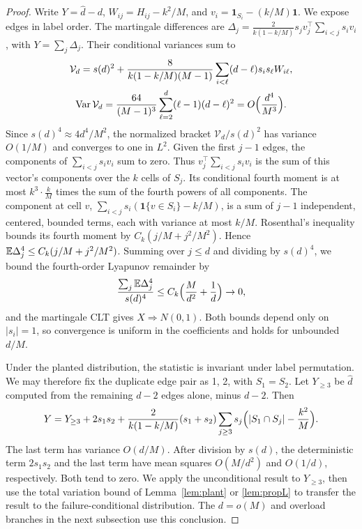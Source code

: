 \begin{proof}
Write $Y=\widehat d-d$, $W_{ij}=H_{ij}-k^2/M$, and $v_i=\mathbf1_{S_i}-(k/M)\mathbf1$. We expose edges in label order. The martingale differences are $\Delta_j=\frac{2}{k(1-k/M)}s_jv_j^\top\sum_{i<j}s_iv_i$, with $Y=\sum_j\Delta_j$. Their conditional variances sum to
\begin{gather*}
\mathcal V_d=s(d)^2+\frac{8}{k(1-k/M)(M-1)}\sum_{i<\ell}(d-\ell)s_is_\ell W_{i\ell},\\
\operatorname{Var}\mathcal V_d=\frac{64}{(M-1)^3}\sum_{\ell=2}^d(\ell-1)(d-\ell)^2=O\Bigl(\frac{d^4}{M^3}\Bigr).
\end{gather*}
Since $s(d)^4\approx4d^4/M^2$, the normalized bracket $\mathcal V_d/s(d)^2$ has variance $O(1/M)$ and converges to one in $L^2$. Given the first $j-1$ edges, the components of $\sum_{i<j}s_iv_i$ sum to zero. Thus $v_j^\top\sum_{i<j}s_iv_i$ is the sum of this vector's components over the $k$ cells of $S_j$. Its conditional fourth moment is at most $k^3\cdot\frac kM$ times the sum of the fourth powers of all components. The component at cell $v$, $\sum_{i<j}s_i(\mathbf1\{v\in S_i\}-k/M)$, is a sum of $j-1$ independent, centered, bounded terms, each with variance at most $k/M$. Rosenthal's inequality \cite{rosenthal1970} bounds its fourth moment by $C_k(j/M+j^2/M^2)$. Hence $\mathbb E\Delta_j^4\le C_k(j/M+j^2/M^2)$. Summing over $j\le d$ and dividing by $s(d)^4$, we bound the fourth-order Lyapunov remainder by
\begin{equation*}
\frac{\sum_j\mathbb E\Delta_j^4}{s(d)^4}\le C_k\Bigl(\frac M{d^2}+\frac1d\Bigr)\to0,
\end{equation*}
and the martingale CLT \cite{hall1980martingale} gives $X\Rightarrow N(0,1)$. Both bounds depend only on $|s_i|=1$, so convergence is uniform in the coefficients and holds for unbounded $d/M$.

Under the planted distribution, the statistic is invariant under label permutation. We may therefore fix the duplicate edge pair as 1, 2, with $S_1=S_2$. Let $Y_{\ge3}$ be $\widehat d$ computed from the remaining $d-2$ edges alone, minus $d-2$. Then
\begin{equation*}
Y=Y_{\ge3}+2s_1s_2+\frac{2}{k(1-k/M)}(s_1+s_2)\sum_{j\ge3}s_j\Bigl(|S_1\cap S_j|-\frac{k^2}{M}\Bigr).
\end{equation*}
The last term has variance $O(d/M)$. After division by $s(d)$, the deterministic term $2s_1s_2$ and the last term have mean squares $O(M/d^2)$ and $O(1/d)$, respectively. Both tend to zero. We apply the unconditional result to $Y_{\ge3}$, then use the total variation bound of Lemma~\ref{lem:plant} or \ref{lem:propL} to transfer the result to the failure-conditional distribution. The $d=o(M)$ and overload branches in the next subsection use this conclusion.
\end{proof}

